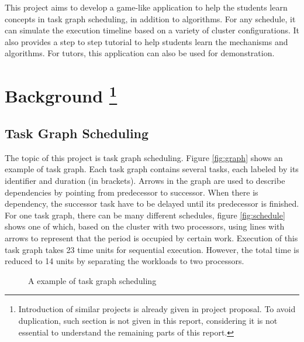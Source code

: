 \documentclass[msc,deptreport, cs]{infthesis}
\begin{document}
This project aims to develop a game-like application to help the students learn concepts in task graph scheduling, in addition to algorithms. For any schedule, it can simulate the execution timeline based on a variety of cluster configurations. It also provides a step to step tutorial to help students learn the mechanisms and algorithms. For tutors, this application can also be used for demonstration.

\chapter[Background]{Background \footnote{Introduction of similar projects is already given in project proposal. To avoid duplication, such section is not given in this report, considering it is not essential to understand the remaining parts of this report.}}

\section{Task Graph Scheduling} \label{sec:tgs}

The topic of this project is task graph scheduling. Figure \ref{fig:graph} shows an example of task graph. Each task graph contains several tasks, each labeled by its identifier and duration (in brackets). Arrows in the graph are used to describe dependencies by pointing from predecessor to successor. When there is dependency, the successor task have to be delayed until its predecessor is finished. For one task graph, there can be many different schedules, figure \ref{fig:schedule} shows one of which, based on the cluster with two processors, using lines with arrows to represent that the period is occupied by certain work. Execution of this task graph takes 23 time units for sequential execution. However, the total time is reduced to 14 units by separating the workloads to two processors.

\begin{figure}[!htb]
    \centering
    \vspace{1em}
     \hspace{2em}
    \caption{A example of task graph scheduling}
    \label{fig:example}
\end{figure}
\end{document}
